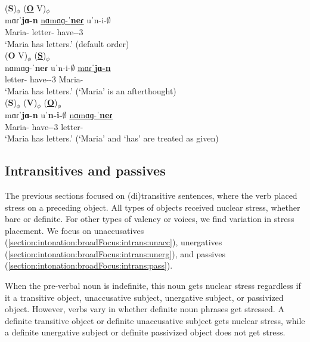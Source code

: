 \begin{exe}
	\ex \begin{xlist}
		\ex \glll  (\textbf{{S}})$_\phi$ (\underline{\textbf{O}} V)$_\phi$\\
		{mɑɾˈ\textbf{jɑ-n}}  \underline{nɑmɑɡ-ˈ\textbf{neɾ}} uˈn-i-$\emptyset$ \\
		Maria-{}  letter-{\pl} have-{\thgloss}-3{\sg} \\
		\trans `Maria has letters.' (default order)\label{example:inton:broad:otherOrder:sov}
		\\ 
		\ex \glll  (\textbf{{O}} V)$_\phi$ (\underline{\textbf{S}})$_\phi$\\
		nɑmɑɡ-ˈ\textbf{neɾ} uˈn-i-$\emptyset$ \underline{mɑɾˈ\textbf{jɑ-n}} \\
		letter-{\pl} have-{\thgloss}-3{\sg} Maria-{} \\
		\trans `Maria has letters.' (`Maria' is an afterthought)\label{example:inton:broad:otherOrder:ovs}
		\\ 
		\ex \glll   (\textbf{{S}})$_\phi$    (\textbf{{V}})$_\phi$ (\underline{\textbf{O}})$_\phi$\\
		{mɑɾˈ\textbf{jɑ-n}} uˈ\textbf{n-i-$\emptyset$}  \underline{nɑmɑɡ-ˈ\textbf{neɾ}}  \\
		Maria-{}   have-{\thgloss}-3{\sg} letter-{\pl}\\
		\trans `Maria has letters.' (`Maria' and `has' are treated as given)\label{example:inton:broad:otherOrder:svo}
		\\ 
	\end{xlist}
\end{exe}
\subsection{Intransitives and passives}\label{section:intonation:broadFocus:intrans}
The previous sections focused on (di)transitive sentences, where the verb placed stress on a preceding object. All types of objects received nuclear stress, whether bare or definite.  For other types of valency or voices, we find variation in stress placement. We focus on unaccusatives (\ref{section:intonation:broadFocus:intrans:unacc}), unergatives (\ref{section:intonation:broadFocus:intrans:unerg}), and passives (\ref{section:intonation:broadFocus:intrans:pass}). 

When the pre-verbal noun is indefinite, this noun gets nuclear stress regardless if it a transitive object, unaccusative subject, unergative subject, or passivized object. However, verbs vary in whether definite noun phrases get stressed. A definite transitive object or definite  unaccusative subject gets nuclear stress, while a definite unergative subject or definite passivized object does not get stress. 


